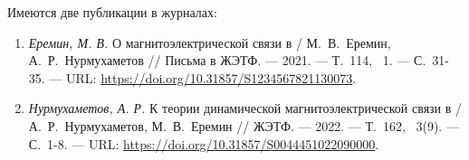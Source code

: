 Имеются две публикации в журналах:

\begin{enumerate}[beginpenalty=10000] %
	\item \textit{Еремин, М. В.} О магнитоэлектрической связи в \ncbo / М.~В.~Еремин, А.~Р.~Нурмухаметов // Письма в ЖЭТФ. --- 2021. --- Т.~114, \textnumero~1. --- С.~31-35. --- URL: \url{https://doi.org/10.31857/S1234567821130073}.
	\item \textit{Нурмухаметов, А. Р.} К теории динамической магнитоэлектрической связи в \cbo / А.~Р.~Нурмухаметов, М.~В.~Еремин // ЖЭТФ. --- 2022. --- Т.~162, \textnumero~3(9). --- С.~1-8. --- URL: \url{https://doi.org/10.31857/S0044451022090000}.
\end{enumerate}


